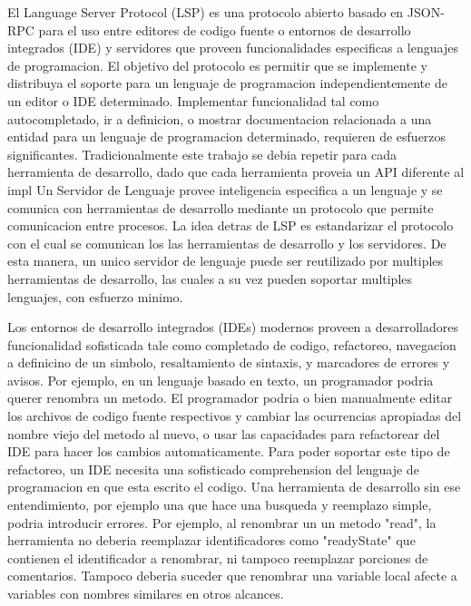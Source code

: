 \documentclass[12pt, a4paper]{report}
\begin{document}
    El Language Server Protocol (LSP) es una protocolo abierto basado en JSON-RPC para el uso entre editores de codigo fuente o entornos de desarrollo integrados (IDE) y servidores que proveen funcionalidades especificas a lenguajes de programacion.
    El objetivo del protocolo es permitir que se implemente y distribuya el soporte para un lenguaje de programacion independientemente de un editor o IDE determinado.
    Implementar funcionalidad tal como autocompletado, ir a definicion, o mostrar documentacion relacionada a una entidad para un lenguaje de programacion determinado, requieren de esfuerzos significantes.
    Tradicionalmente este trabajo se debia repetir para cada herramienta de desarrollo, dado que cada herramienta proveia un API diferente al impl
    Un Servidor de Lenguaje provee inteligencia especifica a un lenguaje y se comunica con herramientas de desarrollo mediante un protocolo que permite comunicacion entre procesos.
    La idea detras de LSP es estandarizar el protocolo con el cual se comunican los las herramientas de desarrollo y los servidores. De esta manera, un unico servidor de lenguaje puede ser reutilizado por multiples herramientas de desarrollo, las cuales a su vez pueden soportar multiples lenguajes, con esfuerzo minimo.
    \cite{language_server_protocol}

    Los entornos de desarrollo integrados (IDEs) modernos proveen a desarrolladores funcionalidad sofisticada tale como completado de codigo, refactoreo, navegacion a definicino de un simbolo, resaltamiento de sintaxis, y marcadores de errores y avisos.
    Por ejemplo, en un lenguaje basado en texto, un programador podria querer renombra un metodo.
    El programador podria o bien manualmente editar los archivos de codigo fuente respectivos y cambiar las ocurrencias apropiadas del nombre viejo del metodo al nuevo, o usar las capacidades para refactorear del IDE para hacer los cambios automaticamente.
    Para poder soportar este tipo de refactoreo, un IDE necesita una sofisticado comprehension del lenguaje de programacion en que esta escrito el codigo.
    Una herramienta de desarrollo sin ese entendimiento, por ejemplo una que hace una busqueda y reemplazo simple, podria introducir errores.
    Por ejemplo, al renombrar un un metodo "read", la herramienta no deberia reemplazar identificadores como "readyState" que contienen el identificador a renombrar, ni tampoco reemplazar porciones de comentarios. Tampoco deberia suceder que renombrar una variable local afecte a variables con nombres similares en otros alcances.
    \cite{language_server_protocol_wiki}
\end{document}
